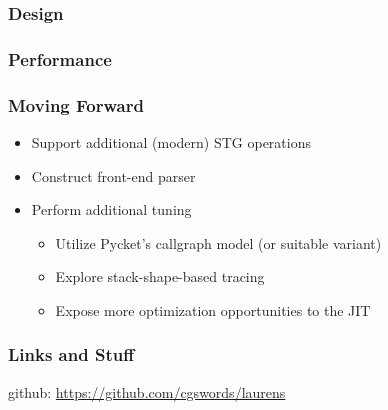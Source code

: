 \documentclass[xetex,serif,mathserif]{beamer}
\newenvironment{slide}[1]{\begin{frame}\frametitle{#1}}{\end{frame}}
\begin{document}
\begin{slide}{Design}
\end{slide}

\begin{slide}{Performance}
\end{slide}

\begin{slide}{Moving Forward}
  \begin{itemize}
    \item Support additional (modern) STG operations
    \item Construct front-end parser
    \item Perform additional tuning
    \begin{itemize}
      \item Utilize Pycket's callgraph model (or suitable variant)
      \item Explore stack-shape-based tracing
      \item Expose more optimization opportunities to the JIT
    \end{itemize}
  \end{itemize}
\end{slide}

\begin{slide}{Links and Stuff}
    \begin{center}
        github: \href{https://github.com/cgswords/laurens}{https://github.com/cgswords/laurens}
    \end{center}
\end{slide}
\end{document}
